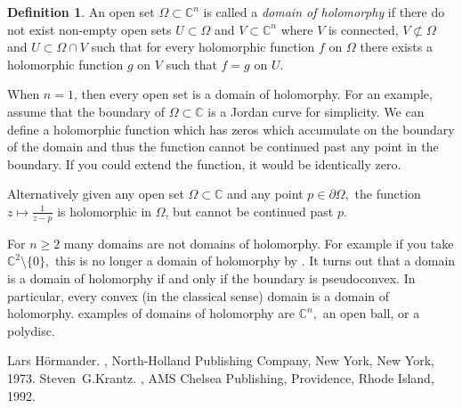 \documentclass[12pt]{article}
\theoremstyle{theorem}
\theoremstyle{definition}
\newtheorem*{defn}{Definition}
\begin{document}
\begin{defn}
An open set $\Omega \subset {\mathbb{C}}^n$ is called a {\em domain of holomorphy}
if there do not exist non-empty open sets $U \subset \Omega$ and $V \subset {\mathbb{C}}^n$ where $V$ is connected, $V \not\subset \Omega$ and $U \subset \Omega \cap V$ such that for every holomorphic function $f$ on $\Omega$ there exists
a holomorphic function $g$ on $V$ such that $f = g$ on $U.$
\end{defn}

When $n=1$, then every open set is a domain of holomorphy.  For an example, assume that the boundary of $\Omega \subset {\mathbb{C}}$ is a Jordan curve for simplicity.  We can define a holomorphic function which has zeros which accumulate on the boundary of the domain and thus the function cannot be continued past any point in the boundary.
If you could extend the function, it would be identically zero.

Alternatively given any open set $\Omega \subset \mathbb{C}$ and any point $p \in \partial \Omega,$ the function $z \mapsto \frac{1}{z-p}$ is holomorphic in $\Omega$, but cannot be continued past $p$.

For $n \geq 2$ many domains are not domains of holomorphy.  For example if you take ${\mathbb{C}}^2 \setminus \{0\},$
this is no longer a domain of holomorphy by .  It turns out that a domain is a domain of holomorphy if and only if the boundary is pseudoconvex.  In particular, every convex (in the classical sense)
domain is a domain of holomorphy.   examples of domains of holomorphy are ${\mathbb{C}}^n,$ an open ball, or a polydisc.

\begin{thebibliography}{9}
Lars H\"ormander.
{\em {}},
North-Holland Publishing Company, New York, New York, 1973.
Steven~G.\@ Krantz.
{\em {}},
AMS Chelsea Publishing, Providence, Rhode Island, 1992.
\end{thebibliography}
\end{document}
